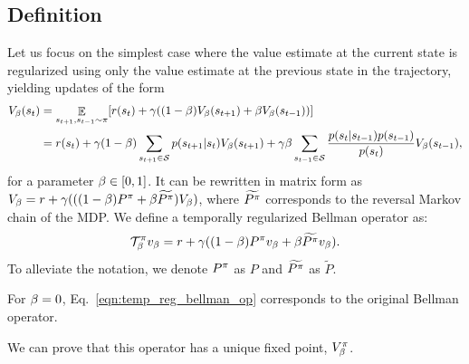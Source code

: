 \subsection{Definition}
Let us focus on the simplest case where the value estimate at the current state is regularized using only the value estimate at the previous state in the trajectory, yielding updates of the form %
\begin{equation}
    \begin{split}
        V_{\beta}(s_{t}) &= \mathop{\mathbb{E}}_{s_{t+1},s_{t-1} \sim \pi} [r(s_t) + \gamma ((1-\beta)V_{\beta}(s_{t+1}) + \beta V_{\beta}(s_{t-1}))]\\
         &= r(s_t) + \gamma (1-\beta)\sum_{s_{t+1}\in \mathcal{S}} p(s_{t+1}|s_t)V_{\beta}(s_{t+1})
         + \gamma \beta \sum_{s_{t-1} \in \mathcal{S}}\frac{p(s_t|s_{t-1}) p(s_{t-1})}{p(s_t)} V_{\beta}(s_{t-1}),
    \end{split}
\end{equation}
for a parameter $\beta \in [0,1]$. It can be rewritten in matrix form as $V_{\beta} = r + \gamma (((1-\beta) P^{\pi} + \beta \widetilde{P^{\pi}})V_{\beta}) $, where $\widetilde{P^{\pi}}$ corresponds to the reversal Markov chain of the MDP.
We define a temporally regularized Bellman operator as:
\begin{equation}
\label{eqn:temp_reg_bellman_op}
    \mathcal{T}^{\pi}_{\beta} v_{\beta} = r + \gamma ((1-\beta) P^{\pi}v_{\beta} + \beta \widetilde{P^{\pi}} v_{\beta}).
\end{equation}
To alleviate the notation, we denote $P^{\pi}$ as $P$ and $\widetilde{P^{\pi}}$ as $\widetilde{P}$.
\begin{remark}
For $\beta =0$, Eq.~\ref{eqn:temp_reg_bellman_op} corresponds to the original Bellman operator.
\end{remark}
We can prove that this operator has a unique fixed point, $V_{\beta}^{\pi}$.
